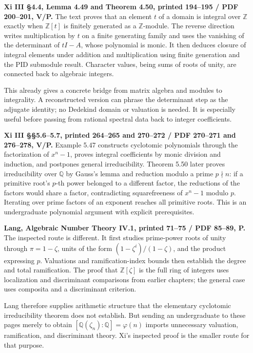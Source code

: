 \documentclass[
  11pt,
]{article}
\begin{document}
\textbf{Xi III §4.4, Lemma 4.49 and Theorem 4.50, printed 194--195 / PDF
200--201, V/P.} The text proves that an element \(t\) of a domain is
integral over \(\mathbb Z\) exactly when \(\mathbb Z[t]\) is finitely
generated as a \(\mathbb Z\)-module. The reverse direction writes
multiplication by \(t\) on a finite generating family and uses the
vanishing of the determinant of \(tI-A\), whose polynomial is monic. It
then deduces closure of integral elements under addition and
multiplication using finite generation and the PID submodule result.
Character values, being sums of roots of unity, are connected back to
algebraic integers.

This already gives a concrete bridge from matrix algebra and modules to
integrality. A reconstructed version can phrase the determinant step as
the adjugate identity; no Dedekind domain or valuation is needed. It is
especially useful before passing from rational spectral data back to
integer coefficients.

\textbf{Xi III §§5.6--5.7, printed 264--265 and 270--272 / PDF 270--271
and 276--278, V/P.} Example 5.47 constructs cyclotomic polynomials
through the factorization of \(x^n-1\), proves integral coefficients by
monic division and induction, and postpones general irreducibility.
Theorem 5.50 later proves irreducibility over \(\mathbb Q\) by Gauss's
lemma and reduction modulo a prime \(p\nmid n\): if a primitive root's
\(p\)-th power belonged to a different factor, the reductions of the
factors would share a factor, contradicting squarefreeness of \(x^n-1\)
modulo \(p\). Iterating over prime factors of an exponent reaches all
primitive roots. This is an undergraduate polynomial argument with
explicit prerequisites.

\textbf{Lang, Algebraic Number Theory IV.1, printed 71--75 / PDF 85--89,
P.} The inspected route is different. It first studies prime-power roots
of unity through \(\pi=1-\zeta\), units of the form
\((1-\zeta^i)/(1-\zeta)\), and the product expressing \(p\). Valuations
and ramification-index bounds then establish the degree and total
ramification. The proof that \(\mathbb Z[\zeta]\) is the full ring of
integers uses localization and discriminant comparisons from earlier
chapters; the general case uses composita and a discriminant criterion.

Lang therefore supplies arithmetic structure that the elementary
cyclotomic irreducibility theorem does not establish. But sending an
undergraduate to these pages merely to obtain
\([\mathbb Q(\zeta_n):\mathbb Q]=\varphi(n)\) imports unnecessary
valuation, ramification, and discriminant theory. Xi's inspected proof
is the smaller route for that purpose.
\end{document}
